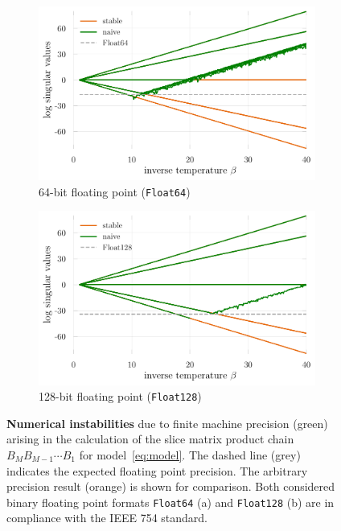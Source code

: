 \documentclass[submission, Phys]{SciPost}
\begin{document}
\begin{figure}
	\centering
	\begin{subfigure}{0.48\textwidth}
		\includegraphics[width=\textwidth]{figures/naive_vs_stable.pdf}
		\caption{64-bit floating point (\texttt{Float64}) \label{fig:naive_vs_stable}}
	\end{subfigure}%
	\hspace{10pt}
	\begin{subfigure}{0.48\textwidth}
		\includegraphics[width=\textwidth]{figures/naive_vs_stable_float128.pdf}
		\caption{128-bit floating point (\texttt{Float128}) \label{fig:naive_vs_stable_float128}}
	\end{subfigure}
	\vspace{5pt}
	\caption[MyCaption]{\textbf{Numerical instabilities} due to finite machine precision (green) arising in the calculation of the slice matrix product chain $B_M B_{M-1} \cdots B_1$ for model~\eqref{eq:model}. The dashed line (grey) indicates the expected floating point precision\protect\footnotemark. The arbitrary precision result (orange) is shown for comparison. Both considered binary floating point formats \texttt{Float64} (a) and \texttt{Float128} (b) are in compliance with the IEEE 754 standard.}
\end{figure}
\end{document}
